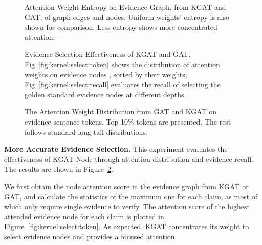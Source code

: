 \documentclass[11pt,a4paper]{article}
\begin{document}
\begin{figure}[t]
	\centering
	\caption{Attention Weight Entropy on Evidence Graph, from KGAT and GAT, of graph edges and nodes. Uniform weights' entropy is also shown for comparison. Less entropy shows more concentrated attention.
}
	\label{fig:kernel:att}
\end{figure}
\begin{figure}[t]
	\centering
	\caption{Evidence Selection Effectiveness of KGAT and GAT. Fig~\ref{fig:kernel:select:token} shows the distribution of attention weights on evidence nodes , sorted by their weights; Fig~\ref{fig:kernel:select:recall} evaluates the recall of selecting the golden standard evidence nodes at different depths.}
	\label{fig:kernel:select}
\end{figure}
\begin{figure}[t]
	\centering
	\caption{The Attention Weight Distribution from GAT and KGAT on evidence sentence tokens. Top 10\% tokens are presented. The rest follows standard long tail distributions.}
	\label{fig:kernel:token}
\end{figure}




\textbf{More Accurate Evidence Selection.}
This experiment evaluates the effectiveness of KGAT-Node through attention distribution and evidence recall. The results are shown in Figure~\ref{fig:kernel:select}.

We first obtain the node attention score in the evidence graph from KGAT or GAT, and calculate the statistics of the maximum one for each claim, as most of which only require single evidence to verify. The attention score of the highest attended evidence node for each claim is plotted in Figure~\ref{fig:kernel:select:token}.
As expected,  KGAT concentrates its weight to select evidence nodes and provides a focused attention.
\end{document}
